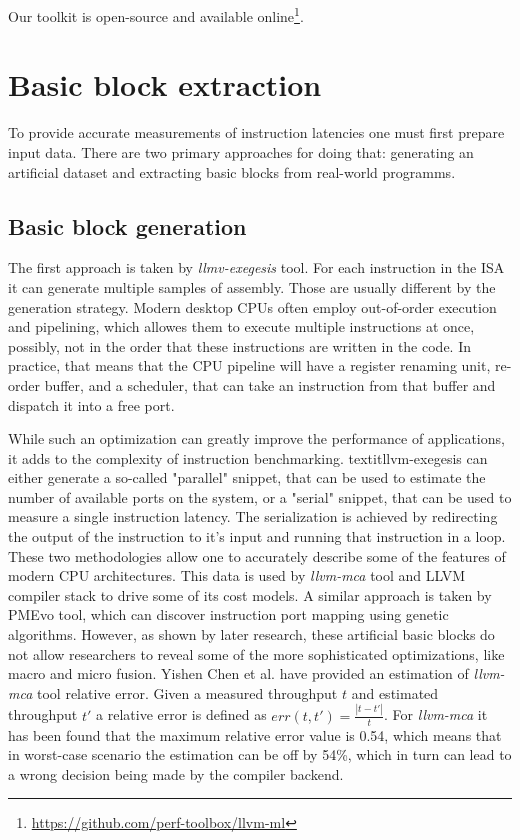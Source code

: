 Our toolkit is open-source and available online\footnote{\url{https://github.com/perf-toolbox/llvm-ml}}.

\section{Basic block extraction}

To provide accurate measurements of instruction latencies one must first prepare input data. There are 
two primary approaches for doing that: generating an artificial dataset and extracting basic blocks from
real-world programms.

\subsection{Basic block generation}

The first approach is taken by \textit{llmv-exegesis} tool. For each instruction in the ISA it can 
generate multiple samples of assembly. Those are usually different by the generation strategy. 
Modern desktop CPUs often employ out-of-order execution and pipelining, which allowes them to execute 
multiple instructions at once, possibly, not in the order that these instructions are written in the 
code. In practice, that means that the CPU pipeline will have a register renaming unit, re-order buffer, 
and a scheduler, that can take an instruction from that buffer and dispatch it into a free port.

While such an optimization can greatly improve the performance of applications, it adds to the complexity 
of instruction benchmarking. textit{llvm-exegesis} can either generate a so-called "parallel" snippet, 
that can be used to estimate the number of available ports on the system, or a "serial" snippet, 
that can be used to measure a single instruction latency. The serialization is achieved by redirecting 
the output of the instruction to it's input and running that instruction in a loop. These two 
methodologies allow one to accurately describe some of the features of modern CPU architectures. 
This data is used by \textit{llvm-mca} tool and LLVM compiler stack to drive some of its cost models. 
A similar approach is taken by PMEvo tool, which can discover instruction port mapping using genetic 
algorithms\cite{ritterPMEvoPortableInference2020}. However, as shown by later research, these artificial 
basic blocks do not allow researchers to reveal some of the more sophisticated optimizations, like macro 
and micro fusion. Yishen Chen et al. \cite{chenBHiveBenchmarkSuite2019} have provided an estimation of 
\textit{llvm-mca} tool relative error. Given a measured throughput $t$ and estimated throughput $t'$ a 
relative error is defined as $err(t, t') = \frac{|t - t'|}{t}$. For \textit{llvm-mca} it has been found 
that the maximum relative error value is 0.54, which means that in worst-case scenario the estimation can
be off by 54\%, which in turn can lead to a wrong decision being made by the compiler backend.

